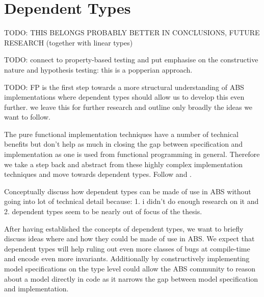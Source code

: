 \section{Dependent Types}
TODO: THIS BELONGS PROBABLY BETTER IN CONCLUSIONS, FUTURE RESEARCH (together with linear types)

TODO: connect to property-based testing and put emphasise on the constructive nature and hypothesis testing: this is a popperian approach.

TODO: FP is the first step towards a more structural understanding of ABS implementations where dependent types should allow us to develop this even further. we leave this for further research and outline only broadly the ideas we want to follow.


The pure functional implementation techniques have a number of technical benefits but don't help as much in closing the gap between specification and implementation as one is used from functional programming in general. Therefore we take a step back and abstract from these highly complex implementation techniques and move towards dependent types. Follow \cite{botta_time_2010} and \cite{botta_functional_2011}.

Conceptually discuss how dependent types can be made of use in ABS without going into lot of technical detail because: 1. i didn't do enough research on it and 2. dependent types seem to be nearly out of focus of the thesis.



After having established the concepts of dependent types, we want to briefly discuss ideas where and how they could be made of use in ABS. We expect that dependent types will help ruling out even more classes of bugs at compile-time and encode even more invariants. Additionally by constructively implementing model specifications on the type level could allow the ABS community to reason about a model directly in code as it narrows the gap between model specification and implementation.

